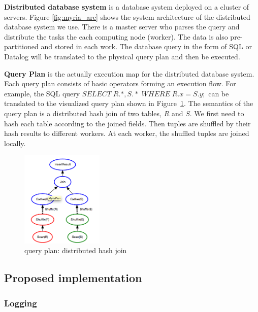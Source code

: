 \documentclass[11pt]{article}
\begin{document}
\noindent\textbf{Distributed database system} is a database system deployed on a cluster of servers.  Figure \ref{fig:myria_arc} shows the system architecture of the distributed database system we use. There is a master server who parses the query and distribute the tasks the each computing node (worker). The data is also pre-partitioned and stored in each work.  The database query in the form of SQL or Datalog will be translated to the physical query plan and then be executed.

\noindent\textbf{Query Plan} is the actually execution map for the distributed database system.  Each query plan consists of basic operators forming an execution flow. For example, the SQL query $SELECT \; R.*, S.*  \; WHERE \; R.x=S.y ;$ can be translated to the visualized query plan shown in Figure~\ref{fig:query_plan}. The semantics of the query plan is a distributed hash join of two tables, $R$ and $S$. We first need to hash each table according to the joined fields. Then tuples are shuffled by their hash results to different workers. At each worker, the shuffled tuples are joined locally.


\begin{figure}
 \begin{center}
     \includegraphics[width=0.35\textwidth]{partition_join.png}
   \end{center}
  \caption{query plan: distributed hash join}
  \label{fig:query_plan}
\end{figure}



\subsection{Proposed implementation}
	\subsubsection{Logging}
\end{document}
